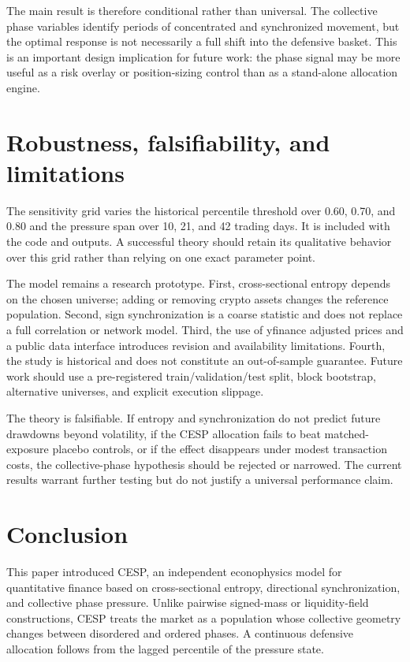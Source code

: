 \documentclass[11pt]{article}
\begin{document}
The main result is therefore conditional rather than universal. The collective
phase variables identify periods of concentrated and synchronized movement, but
the optimal response is not necessarily a full shift into the defensive basket.
This is an important design implication for future work: the phase signal may be
more useful as a risk overlay or position-sizing control than as a stand-alone
allocation engine.

\section{Robustness, falsifiability, and limitations}

The sensitivity grid varies the historical percentile threshold over 0.60, 0.70,
and 0.80 and the pressure span over 10, 21, and 42 trading days. It is included
with the code and outputs. A successful theory should retain its qualitative
behavior over this grid rather than relying on one exact parameter point.

The model remains a research prototype. First, cross-sectional entropy depends
on the chosen universe; adding or removing crypto assets changes the reference
population. Second, sign synchronization is a coarse statistic and does not replace
a full correlation or network model. Third, the use of yfinance adjusted prices
and a public data interface introduces revision and availability limitations.
Fourth, the study is historical and does not constitute an out-of-sample guarantee.
Future work should use a pre-registered train/validation/test split, block bootstrap,
alternative universes, and explicit execution slippage.

The theory is falsifiable. If entropy and synchronization do not predict future
drawdowns beyond volatility, if the CESP allocation fails to beat matched-exposure
placebo controls, or if the effect disappears under modest transaction costs, the
collective-phase hypothesis should be rejected or narrowed. The current results
warrant further testing but do not justify a universal performance claim.

\section{Conclusion}

This paper introduced CESP, an independent econophysics model for quantitative
finance based on cross-sectional entropy, directional synchronization, and
collective phase pressure. Unlike pairwise signed-mass or liquidity-field
constructions, CESP treats the market as a population whose collective geometry
changes between disordered and ordered phases. A continuous defensive allocation
follows from the lagged percentile of the pressure state.
\end{document}
